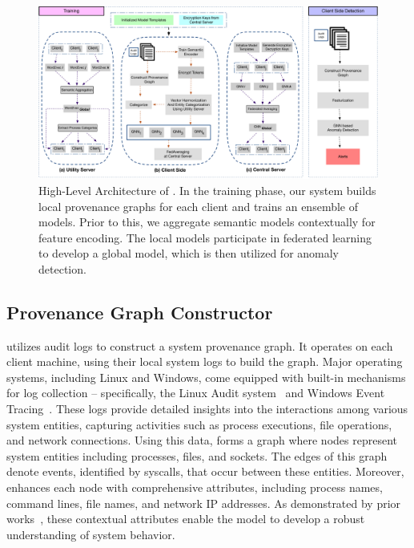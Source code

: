 
\begin{figure}[t!]
  \centering
  \includegraphics[width=\textwidth]{fig/archv3.pdf}
  \caption{High-Level Architecture of \Sys. In the training phase, our system builds local provenance graphs for each client and trains an ensemble of \gnnshort models. Prior to this, we aggregate semantic models contextually for feature encoding. The local \gnnshort models participate in federated learning to develop a global \gnnshort model, which is then utilized for anomaly detection. }
  \vspace{-3ex}
  \label{fig:arch}
\end{figure}

\subsection{Provenance Graph Constructor} 
\Sys utilizes audit logs to construct a system provenance graph. It operates on each client machine, using their local system logs to build the graph. Major operating systems, including Linux and Windows, come equipped with built-in mechanisms for log collection -- specifically, the Linux Audit system~\cite{linuxaudit} and Windows Event Tracing~\cite{windowsaudit}. These logs provide detailed insights into the interactions among various system entities, capturing activities such as process executions, file operations, and network connections. Using this data, \Sys forms a graph where nodes represent system entities including processes, files, and sockets. The edges of this graph denote events, identified by syscalls, that occur between these entities. Moreover, \Sys enhances each node with comprehensive attributes, including process names, command lines, file names, and network IP addresses. As demonstrated by prior works~\cite{flash2024,cheng2023kairos}, these contextual attributes enable the model to develop a robust understanding of system behavior.

